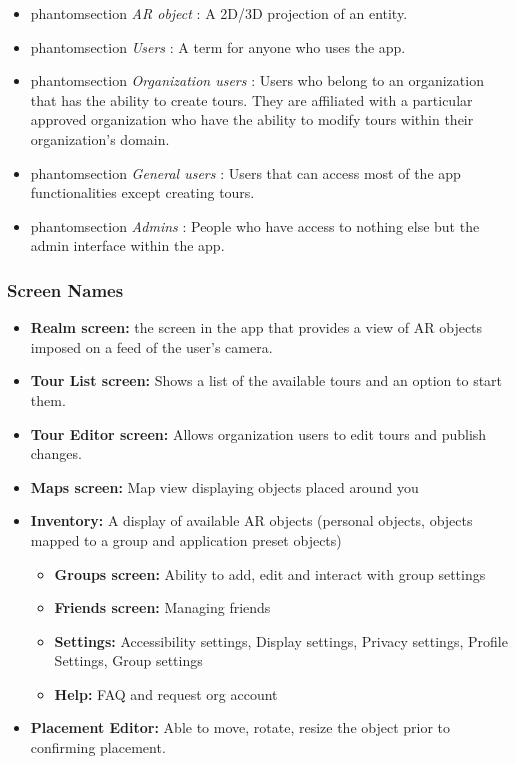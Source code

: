 \documentclass{article}
\makeatletter
\newcommand{\labeltext}[3][]{%
    \@bsphack%
    \csname phantomsection\endcsname%
    \def\tst{#1}%
    \def\labelmarkup{\emph}%
    \def\refmarkup{}%
    \ifx\tst\empty\def\@currentlabel{\refmarkup{#2}}{\label{#3}}%
    \else\def\@currentlabel{\refmarkup{#1}}{\label{#3}}\fi%
    \@esphack%
    \labelmarkup{#2}%
}
\makeatother
\begin{document}
\begin{itemize}
    \item \labeltext{AR object}{def:ar_obj}: A 2D/3D projection of an entity.
    \item \labeltext{Users}{def:user}: A term for anyone who uses the app.
    \item \labeltext{Organization users}{def:org_user}: Users who belong to an organization that has the ability to create tours. They are affiliated with a particular approved organization who have the ability to modify tours within their organization’s domain.
    \item \labeltext{General users}{def:gen_user}: Users that can access most of the app functionalities except creating tours.
    \item \labeltext{Admins}{def:admin}: People who have access to nothing else but the admin interface within the app.
\end{itemize}

\subsubsection{Screen Names}
\begin{itemize}
    \item \textbf{Realm screen:} the screen in the app that provides a view of AR objects imposed on a feed of the user’s camera.
    \item \textbf{Tour List screen:} Shows a list of the available tours and an option to start them.
    \item \textbf{Tour Editor screen:} Allows organization users to edit tours and publish changes.
    \item \textbf{Maps screen:} Map view displaying objects placed around you
    \item \textbf{Inventory:} A display of available AR objects (personal objects, objects mapped to a group and application preset objects)
    \begin{itemize}
        \item \textbf{Groups screen:} Ability to add, edit and interact with group settings
        \item \textbf{Friends screen:} Managing friends
        \item \textbf{Settings:} Accessibility settings, Display settings, Privacy settings, Profile Settings, Group settings
        \item \textbf{Help:} FAQ and request org account
    \end{itemize}
    \item \textbf{Placement Editor:} Able to move, rotate, resize the object prior to confirming placement.
\end{itemize}
\end{document}
